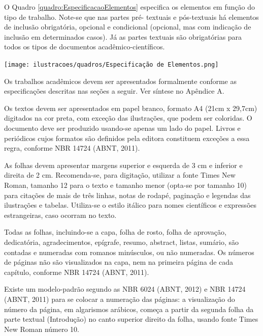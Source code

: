 \documentclass[a4paper,12pt]{article}  %
\begin{document}
\begin{ElementosTextuais}
\begin{Desenvolvimento}
O Quadro \ref{quadro:EspecificacaoElementos} especifica os elementos em função do tipo de trabalho. Note-se que nas partes pré- textuais e pós-textuais há elementos de inclusão obrigatória, opcional e condicional (opcional, mas com indicação de inclusão em determinados casos). Já as partes textuais são obrigatórias para todos os tipos de documentos acadêmico-científicos.

\begin{quadro} [h!]
  \centering
  \addquadro
  \texttt{[image: ilustracoes/quadros/Especificação de Elementos.png]}
  \label{quadro:EspecificacaoElementos}
\end{quadro}

Os trabalhos acadêmicos devem ser apresentados formalmente conforme as especificações descritas nas seções a seguir. Ver síntese no Apêndice A.

Os textos devem ser apresentados em papel branco, formato A4 (21cm x 29,7cm) digitados na cor preta, com exceção das ilustrações, que podem ser coloridas. O documento deve ser produzido usando-se apenas um lado do papel. Livros e periódicos cujos formatos são definidos pela editora constituem exceções a essa regra, conforme NBR 14724 (ABNT, 2011).

As folhas devem apresentar margens superior e esquerda de 3 cm e inferior e direita de 2 cm. Recomenda-se, para digitação, utilizar a fonte Times New Roman, tamanho 12 para o texto e tamanho menor (opta-se por tamanho 10) para citações de mais de três linhas, notas de rodapé, paginação e legendas das ilustrações e tabelas. Utiliza-se o estilo itálico para nomes científicos e expressões estrangeiras, caso ocorram no texto.

Todas as folhas, incluindo-se a capa, folha de rosto, folha de aprovação, dedicatória, agradecimentos, epígrafe, resumo, abstract, listas, sumário, são contadas e numeradas com romanos minúsculos, ou não numeradas. Os números de páginas não são visualizados na capa, nem na primeira página de cada capítulo, conforme NBR 14724 (ABNT, 2011).

Existe um modelo-padrão segundo as NBR 6024 (ABNT, 2012) e NBR 14724 (ABNT, 2011) para se colocar a numeração das páginas: a visualização do número da página, em algarismos arábicos, começa a partir da segunda folha da parte textual (Introdução) no canto superior direito da folha, usando fonte Times New Roman número 10.


\end{Desenvolvimento}
\end{ElementosTextuais}
\end{document}
